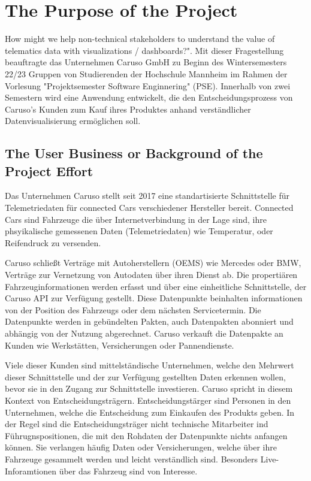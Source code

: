 \chapter{The Purpose of the Project}
How might we help non-technical stakeholders to understand the value of telematics data with visualizations / dashboards?". Mit dieser Fragestellung beauftragte das Unternehmen Caruso GmbH zu Beginn des Wintersemesters 22/23 Gruppen von Studierenden der Hochschule Mannheim im Rahmen der Vorlesung "Projektsemester Software Enginnering" (PSE). Innerhalb von zwei Semestern wird eine Anwendung entwickelt, die den Entscheidungsprozess von Caruso's Kunden zum Kauf ihres Produktes anhand verständlicher Datenvisualisierung ermöglichen soll.

\section{The User Business or Background of the Project Effort}
Das Unternehmen Caruso stellt seit 2017 eine standartisierte Schnittstelle für Telemetriedaten für connected Cars verschiedener Hersteller bereit. Connected Cars sind Fahrzeuge die über Internetverbindung in der Lage sind, ihre phsyikalische gemessenen Daten (Telemetriedaten) wie Temperatur, oder Reifendruck zu versenden.

Caruso schließt Verträge mit Autoherstellern (OEMS) wie Mercedes oder BMW, Verträge zur Vernetzung von Autodaten über ihren Dienst ab. Die propertiären Fahrzeuginformationen werden erfasst und über eine einheitliche Schnittstelle, der Caruso API zur Verfügung gestellt. Diese Datenpunkte beinhalten informationen von der Position des Fahrzeugs oder dem nächsten Servicetermin. Die Datenpunkte werden in gebündelten Pakten, auch Datenpakten abonniert und abhängig von der Nutzung abgerechnet. Caruso verkauft die Datenpakte an Kunden wie Werkstätten, Versicherungen oder Pannendienste.


Viele dieser Kunden sind mittelständische Unternehmen, welche den Mehrwert dieser Schnittstelle und der zur Verfügung gestellten Daten erkennen wollen, bevor sie in den Zugang zur Schnittstelle investieren. Caruso spricht in diesem Kontext von Entscheidungsträgern. Entscheidungstärger sind Personen in den Unternehmen, welche die Entscheidung zum Einkaufen des Produkts geben. In der Regel sind die Entscheidungsträger nicht technische Mitarbeiter ind Führugnspositionen, die mit den Rohdaten der Datenpunkte nichts anfangen können. Sie verlangen häufig Daten oder Versicherungen, welche über ihre Fahrzeuge gesammelt werden und leicht verständlich sind. Besonders Live-Inforamtionen über das Fahrzeug sind von Interesse.

